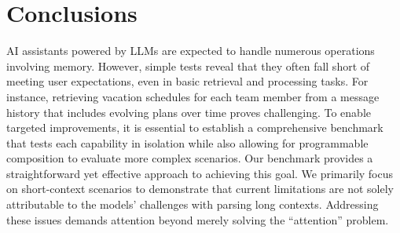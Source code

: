 \section{Conclusions}

AI assistants powered by LLMs are expected to handle numerous operations involving memory. However, simple tests reveal that they often fall short of meeting user expectations, even in basic retrieval and processing tasks. For instance, retrieving vacation schedules for each team member from a message history that includes evolving plans over time proves challenging. To enable targeted improvements, it is essential to establish a comprehensive benchmark that tests each capability in isolation while also allowing for programmable composition to evaluate more complex scenarios. Our benchmark provides a straightforward yet effective approach to achieving this goal. We primarily focus on short-context scenarios to demonstrate that current limitations are not solely attributable to the models' challenges with parsing long contexts. Addressing these issues demands attention beyond merely solving the ``attention'' problem.